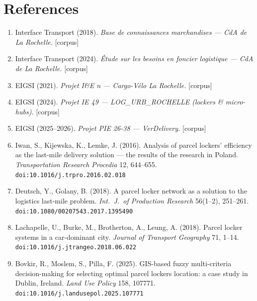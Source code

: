 \documentclass[3p,times]{elsarticle}
\begin{document}
\section*{References}
{\footnotesize
\begin{enumerate}\setlength{\itemsep}{0pt}
\item Interface Transport (2018). \emph{Base de connaissances marchandises --- CdA de La Rochelle.} [corpus]
\item Interface Transport (2024). \emph{\'Etude sur les besoins en foncier logistique --- CdA de La Rochelle.} [corpus]
\item EIGSI (2021). \emph{Projet I\&E n --- Cargo-V\'elo La Rochelle.} [corpus]
\item EIGSI (2024). \emph{Projet IE 49 --- LOG\_URB\_ROCHELLE (lockers \& micro-hubs).} [corpus]
\item EIGSI (2025--2026). \emph{Projet PIE 26-38 --- VerDelivery.} [corpus]
\item Iwan, S., Kijewska, K., Lemke, J. (2016). Analysis of parcel lockers' efficiency as the last-mile delivery solution --- the results of the research in Poland. \emph{Transportation Research Procedia} 12, 644--655. \texttt{doi:10.1016/j.trpro.2016.02.018}
\item Deutsch, Y., Golany, B. (2018). A parcel locker network as a solution to the logistics last-mile problem. \emph{Int.\ J.\ of Production Research} 56(1--2), 251--261. \texttt{doi:10.1080/00207543.2017.1395490}
\item Lachapelle, U., Burke, M., Brotherton, A., Leung, A. (2018). Parcel locker systems in a car-dominant city. \emph{Journal of Transport Geography} 71, 1--14. \texttt{doi:10.1016/j.jtrangeo.2018.06.022}
\item Bovkir, R., Moslem, S., Pilla, F. (2025). GIS-based fuzzy multi-criteria decision-making for selecting optimal parcel lockers location: a case study in Dublin, Ireland. \emph{Land Use Policy} 158, 107771. \texttt{doi:10.1016/j.landusepol.2025.107771}
\end{enumerate}}
\end{document}

